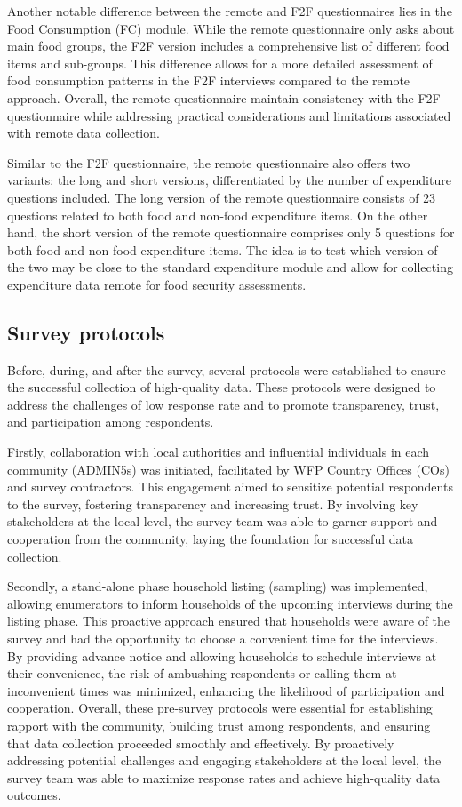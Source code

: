 \documentclass[11pt,harvard]{article}
\begin{document}
Another notable difference between the remote and F2F questionnaires lies in the Food Consumption (FC) module. While the remote questionnaire only asks about main food groups, the F2F version includes a comprehensive list of different food items and sub-groups. This difference allows for a more detailed assessment of food consumption patterns in the F2F interviews compared to the remote approach. Overall, the remote questionnaire maintain consistency with the F2F questionnaire while addressing practical considerations and limitations associated with remote data collection. 

Similar to the F2F questionnaire, the remote questionnaire also offers two variants: the long and short versions, differentiated by the number of expenditure questions included. The long version of the remote questionnaire consists of 23 questions related to both food and non-food expenditure items. On the other hand, the short version of the remote questionnaire comprises only 5 questions for both food and non-food expenditure items. The idea is to test which version of the two may be close to the standard expenditure module and allow for collecting expenditure data remote for food security assessments.


\subsection{Survey protocols}

Before, during, and after the survey, several protocols were established to ensure the successful collection of high-quality data. These protocols were designed to address the challenges of low response rate and to promote transparency, trust, and participation among respondents.

Firstly, collaboration with local authorities and influential individuals in each community (ADMIN5s) was initiated, facilitated by WFP Country Offices (COs) and survey contractors. This engagement aimed to sensitize potential respondents to the survey, fostering transparency and increasing trust. By involving key stakeholders at the local level, the survey team was able to garner support and cooperation from the community, laying the foundation for successful data collection.

Secondly, a stand-alone phase household listing (sampling) was implemented, allowing enumerators to inform households of the upcoming interviews during the listing phase. This proactive approach ensured that households were aware of the survey and had the opportunity to choose a convenient time for the interviews. By providing advance notice and allowing households to schedule interviews at their convenience, the risk of ambushing respondents or calling them at inconvenient times was minimized, enhancing the likelihood of participation and cooperation. Overall, these pre-survey protocols were essential for establishing rapport with the community, building trust among respondents, and ensuring that data collection proceeded smoothly and effectively. By proactively addressing potential challenges and engaging stakeholders at the local level, the survey team was able to maximize response rates and achieve high-quality data outcomes. 
\end{document}
